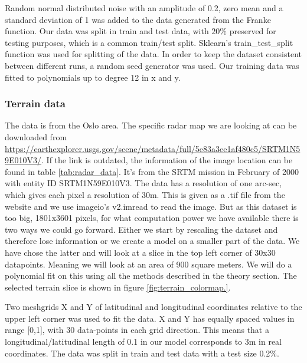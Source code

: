 Random normal distributed noise with an amplitude of 0.2, zero mean and a
standard deviation of 1 was added to the data generated from the Franke
function. Our data was split in train and test data, with $20\%$ preserved for
testing purposes, which is a common train/test split. Sklearn's train\_test\_split function was used for splitting
of the data. In order to keep the dataset consistent between different runs, a
random seed generator was used. Our training data was fitted to polynomials up
to degree 12 in x and y. 



\subsubsection{Terrain data}
The data is from the Oslo area. The specific radar map we are looking at can be
downloaded from
\href{https://earthexplorer.usgs.gov/scene/metadata/full/5e83a3ee1af480c5/SRTM1N59E010V3/}{https://earthexplorer.usgs.gov/scene/metadata/full/5e83a3ee1af480c5/SRTM1N59E010V3/}.
If the link is outdated, the information of the image location can be found in
table \ref{tab:radar_data}. It's from the SRTM mission in February of 2000 with
entity ID SRTM1N59E010V3. The data has a resolution of one arc-sec, which gives
each pixel a resolution of 30m. This is given as a .tif file from the website
and we use imageio's v2.imread to read the image. But as this dataset is too
big, 1801x3601 pixels, for what computation power we have available there is
two ways we could go forward. Either we start by rescaling the dataset and
therefore lose information or we create a model on a smaller part of the data.
We have chose the latter and will look at a slice in the top left corner of
30x30 datapoints. Meaning we will look at an area of 900 square meters. We will
do a polynomial fit on this using all the methods described in the theory
section. The selected terrain slice is shown in figure \ref{fig:terrain_colormap.}. 


Two meshgrids X and Y of latitudinal and longitudinal coordinates relative to
the upper left corner was used to fit the data. X and Y has equally spaced
values in range [0,1], with 30 data-points in each grid direction. This means
that a longitudinal/latitudinal length of 0.1 in our model corresponds to 3m in
real coordinates. The data was split in train and test data with a test size
0.2\%. 

